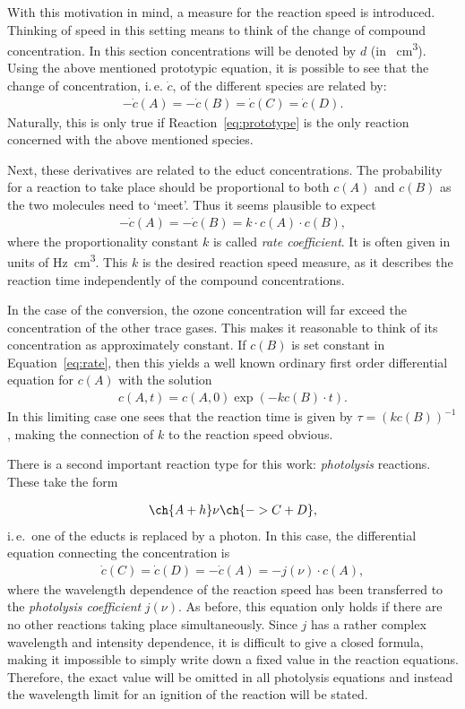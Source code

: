 With this motivation in mind, a measure for the reaction speed is
introduced. Thinking of speed in this setting means to think of the
change of compound concentration. In this section concentrations will
be denoted by $d$ (in \si{\per\cubic\centi\meter}). Using the above
mentioned prototypic equation, it is possible to see that the change
of concentration, i.\,e. $\dot c$, of the different species are
related by:
\begin{align*}
  -\dot c(A) = - \dot c(B) = \dot c(C) = \dot c(D).
\end{align*}
Naturally, this is only true if Reaction~\eqref{eq:prototype} is the
only reaction concerned with the above mentioned species.

Next, these derivatives are related to the educt concentrations. The
probability for a reaction to take place should be proportional to
both $c(A)$ and $c(B)$ as the two molecules need to `meet'. Thus it
seems plausible to expect
\begin{align}
  -\dot c(A) = - \dot c(B) = k \cdot c(A) \cdot c(B), \label{eq:rate}
\end{align}
where the proportionality constant $k$ is called \emph{rate
  coefficient}. It is often given in units of
\si{\hertz\cubic\centi\meter}. This $k$ is the desired reaction
speed measure, as it describes the
reaction time independently of the compound concentrations.

In the case of the conversion, the ozone concentration will far exceed
the concentration of the other trace gases. This makes it reasonable
to think of its concentration as approximately constant. If $c(B)$ is
set constant in Equation~\eqref{eq:rate}, then this yields a well
known ordinary first order differential equation for $c(A)$ with the
solution
\begin{align*}
  c(A,t) = c(A,0)\exp(-kc(B)\cdot t).
\end{align*}
In this limiting case one sees that the reaction time is given by $\tau =
(kc(B))^{-1}$, making the connection of $k$ to the reaction speed
obvious.

There is a second important reaction type for this work:
\emph{photolysis} reactions. These take the form

\begin{align}
  \ch{A + h}\nu \ch{-> C + D},
\end{align}
i.\,e.\ one of the educts is replaced by a photon. In this case, the
differential equation connecting the concentration is
\begin{align}
  \dot c(C) = \dot c(D) = -\dot c(A) = - j(\nu) \cdot c(A),
\end{align}
where the wavelength dependence of the reaction speed has been
transferred to the \emph{photolysis coefficient} $j(\nu)$. As before,
this equation only holds if there are no other reactions taking place
simultaneously. Since $j$ has a rather complex wavelength and
intensity dependence, it is difficult to give a closed formula, making
it impossible to simply write down a fixed value in the reaction
equations. Therefore, the exact value will be omitted in all photolysis
equations and instead the wavelength limit for an ignition of the
reaction will be stated.

